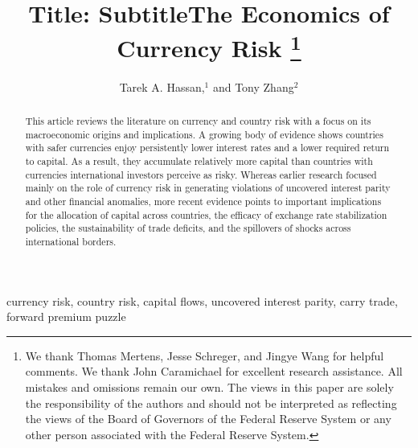 \documentclass{ar-1col}
\begin{document}

\title{Title: Subtitle}


\author{Tarek A. Hassan,$^1$ and Tony Zhang$^2$  }



    \title{The Economics of Currency Risk \thanks{We thank Thomas Mertens, Jesse Schreger, and Jingye Wang for helpful comments. We thank John Caramichael for excellent research assistance. All mistakes and omissions remain our own. The views in this paper are solely the responsibility of the authors and should not be interpreted as reflecting the views of the Board of Governors of the Federal Reserve System or any other person associated with the Federal Reserve System.}}



\begin{abstract}
  This article reviews the literature on currency and country risk with a focus on its macroeconomic origins and implications. A growing body of evidence shows countries with safer currencies enjoy persistently lower interest rates and a lower required return to capital. As a result, they accumulate relatively more capital than countries with currencies international investors perceive as risky. Whereas earlier research focused mainly on the role of currency risk in generating violations of uncovered interest parity and other financial anomalies, more recent evidence points to important implications for the allocation of capital across countries, the efficacy of exchange rate stabilization policies, the sustainability of trade deficits, and the spillovers of shocks across international borders.
\end{abstract}


\begin{keywords}
  currency risk, country risk, capital flows, uncovered interest parity, carry trade, forward premium puzzle
\end{keywords}
\maketitle

\end{document}
